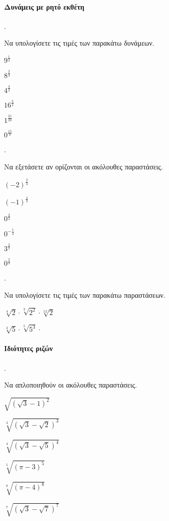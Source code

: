 \documentclass[11pt,a4paper,twocolumn]{article}
\newcounter{askhsh}
\newcommand{\askhsh}{\large\theaskhsh.\ \addtocounter{askhsh}{1}}
\begin{document}
\paragraph{Δυνάμεις με ρητό εκθέτη}
\askhsh Να υπολογίσετε τις τιμές των παρακάτω δυνάμεων.
\begin{multicols}{3}
\begin{alist}
\item $9^{\frac{1}{2}}$
\item $8^{\frac{2}{3}}$
\item $4^{\frac{3}{2}}$
\item $16^{\frac{3}{2}}$
\item $1^{\frac{21}{20}}$
\item $0^{\frac{15}{8}}$
\end{alist}
\end{multicols}
\askhsh Να εξετάσετε αν ορίζονται οι ακόλουθες παραστάσεις.
\begin{multicols}{3}
\begin{alist}
\item $(-2)^{\frac{2}{3}}$
\item $(-1)^{\frac{4}{3}}$
\item $0^{\frac{3}{2}}$
\item $0^{-\frac{1}{2}}$
\item $3^{\frac{3}{5}}$
\item $0^{\frac{2}{3}}$
\end{alist}
\end{multicols}
\askhsh Να υπολογίσετε τις τιμές των παρακάτω παραστάσεων.
\begin{multicols}{2}
\begin{alist}
\item $\sqrt[4]{2}\cdot\sqrt[3]{2^2}\cdot\sqrt[12]{2}$
\item $\sqrt[3]{5}\cdot\sqrt[5]{5^3}\cdot$
\end{alist}
\end{multicols}
\paragraph{Ιδιότητες ριζών}
\askhsh Να απλοποιηθούν οι ακόλουθες παραστάσεις.
\begin{multicols}{2}
\begin{alist}
\item $\sqrt{\left(\sqrt{3}-1\right)^2}$
\item $\sqrt[3]{\left(\sqrt{3}-\sqrt{2}\right)^3}$
\item $\sqrt[4]{\left(\sqrt{3}-\sqrt{5}\right)^4}$
\item $\sqrt[5]{\left(\pi-3\right)^5}$
\item $\sqrt[8]{\left(\pi-4\right)^8}$
\item $\sqrt[7]{\left(\sqrt{3}-\sqrt{7}\right)^7}$
\end{alist}
\end{multicols}
\end{document}
